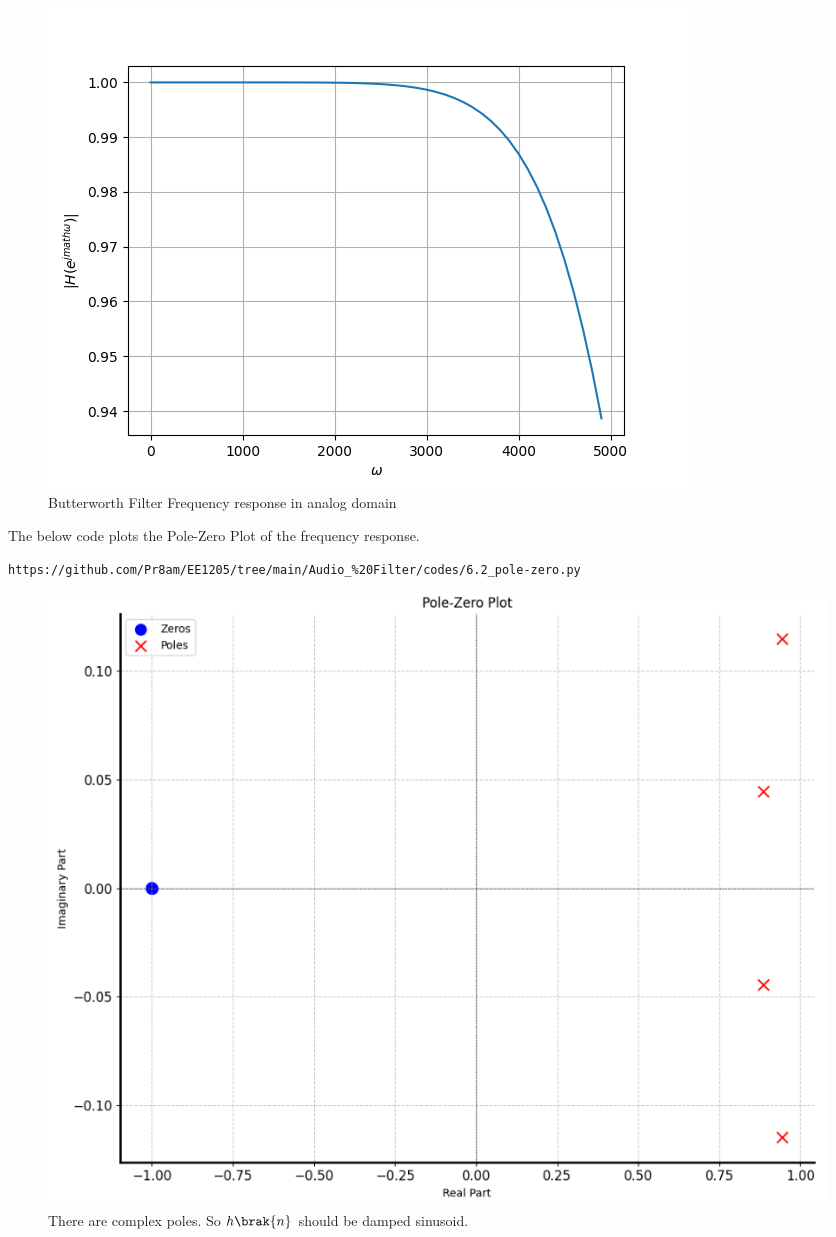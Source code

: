 \documentclass[journal,12pt,twocolumn]{IEEEtran}
\theoremstyle{remark}
\begin{document}
\begin{enumerate}[label=\thesection.\arabic*]
\begin{figure}[H]
\includegraphics[width=1\columnwidth]{figs/Butterworth_analog.png}
\caption{Butterworth Filter Frequency response in analog domain}
\label{fig:H(w)_6}
\end{figure}



The below code plots the Pole-Zero Plot of the frequency response.
\begin{lstlisting}
https://github.com/Pr8am/EE1205/tree/main/Audio_%20Filter/codes/6.2_pole-zero.py
\end{lstlisting}
\begin{figure}[H]
\centering
\includegraphics[width=1\columnwidth]{figs/Pole_Zero_Plt.png}
\caption{There are complex poles. So $h\brak{n}$ should be damped sinusoid.}
\label{fig:pole_zero_6.2}
\end{figure}


\end{enumerate}
\end{document}

